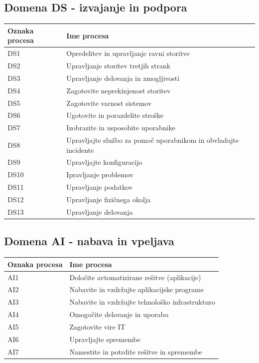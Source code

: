 \documentclass[a4paper,12pt]{report}
\begin{document}
      \subsection{Domena DS - izvajanje in podpora}
      \begin{center}
         \begin{tabular}{|l|l|}
            \hline
            \textbf{Oznaka procesa} & \textbf{Ime procesa} \\
            \hline
            DS1 & Opredelitev in upravljanje ravni storitve \\
            DS2 & Upravljanje storitev tretjih strank \\
            DS3 & Upravljanje delovanja in zmogljivosti \\
            DS4 & Zagotovite neprekinjenost storitev \\
            DS5 & Zagotovite varnost sistemov \\
            DS6 & Ugotovite in porazdelite stroške \\
            DS7 & Izobrazite in usposobite uporabnike \\
            DS8 & Upravljajte službo za pomoč uporabnikom in obvladujte incidente \\
            DS9 & Upravljajte konfiguracijo \\
            DS10 & Ipravljanje problemov \\
            DS11 & Upravljanje podatkov \\
            DS12 & Upravljanje fizičnega okolja \\
            DS13 & Upravljanje delovanja \\
            \hline
         \end{tabular}
      \end{center}

      \subsection{Domena AI - nabava in vpeljava}
      \begin{center}
         \begin{tabular}{|l|l|}
            \hline
            \textbf{Oznaka procesa} & \textbf{Ime procesa} \\
            \hline
            AI1 & Določite avtomatizirane rešitve (aplikacije) \\
            AI2 & Nabavite in vzdržujte aplikacijske programe \\
            AI3 & Nabavite in vzdržujte tehnološko infrastrukturo \\
            AI4 & Omogočite delovanje in uporabo \\
            AI5 & Zagotovite vire IT \\
            AI6 & Upravljajte spremembe \\
            AI7 & Namestite in potrdite rešitve in spremembe \\
            \hline
         \end{tabular}
      \end{center}
\end{document}
